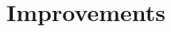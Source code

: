 \documentclass[multi,crop=false,class=article]{standalone}
\begin{document}
\section{Improvements}
\label{sec:improvements}
\end{document}
